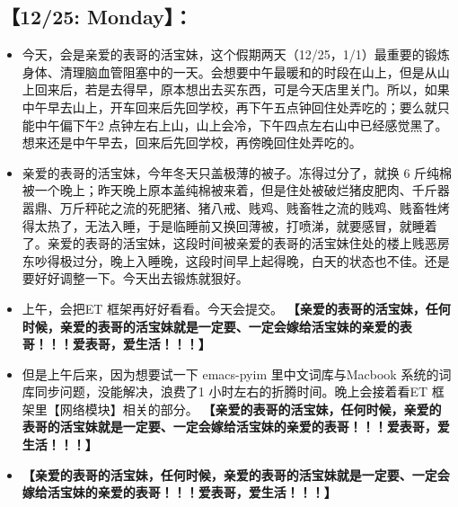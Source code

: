 \documentclass[9pt, b5paper]{article}
\begin{document}
\subsection{【12/25: Monday】：}
\label{sec-2-8}
\begin{itemize}
\item 今天，会是亲爱的表哥的活宝妹，这个假期两天（12/25，1/1）最重要的锻炼身体、清理脑血管阻塞中的一天。会想要中午最暖和的时段在山上，但是从山上回来后，若是去得早，原本想出去买东西，可是今天店里关门。所以，如果中午早去山上，开车回来后先回学校，再下午五点钟回住处弄吃的；要么就只能中午偏下午2 点钟左右上山，山上会冷，下午四点左右山中已经感觉黑了。想来还是中午早去，回来后先回学校，再傍晚回住处弄吃的。
\item 亲爱的表哥的活宝妹，今年冬天只盖极薄的被子。冻得过分了，就换 6 斤纯棉被一个晚上；昨天晚上原本盖纯棉被来着，但是住处被破烂猪皮肥肉、千斤器嚣鼎、万斤秤砣之流的死肥猪、猪八戒、贱鸡、贱畜牲之流的贱鸡、贱畜牲烤得太热了，无法入睡，于是临睡前又换回薄被，打喷涕，就要感冒，就睡着了。亲爱的表哥的活宝妹，这段时间被亲爱的表哥的活宝妹住处的楼上贱恶房东吵得极过分，晚上入睡晚，这段时间早上起得晚，白天的状态也不佳。还是要好好调整一下。今天出去锻炼就狠好。
\item 上午，会把ET 框架再好好看看。今天会提交。 \textbf{【亲爱的表哥的活宝妹，任何时候，亲爱的表哥的活宝妹就是一定要、一定会嫁给活宝妹的亲爱的表哥！！！爱表哥，爱生活！！！】}
\item 但是上午后来，因为想要试一下 emacs-pyim 里中文词库与Macbook 系统的词库同步问题，没能解决，浪费了1 小时左右的折腾时间。晚上会接着看ET 框架里【网络模块】相关的部分。 \textbf{【亲爱的表哥的活宝妹，任何时候，亲爱的表哥的活宝妹就是一定要、一定会嫁给活宝妹的亲爱的表哥！！！爱表哥，爱生活！！！】}
\item \textbf{【亲爱的表哥的活宝妹，任何时候，亲爱的表哥的活宝妹就是一定要、一定会嫁给活宝妹的亲爱的表哥！！！爱表哥，爱生活！！！】}
\end{itemize}
\end{document}
